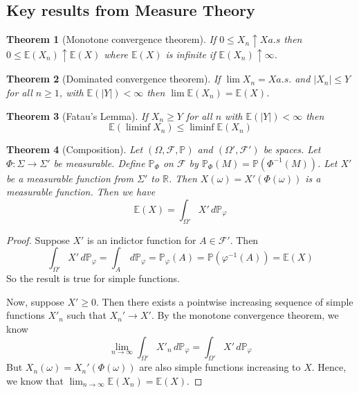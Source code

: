 \documentclass[10pt, oneside, reqno]{amsart}
\theoremstyle{plain}%
\newtheorem{thm}{Theorem}[section]
\theoremstyle{definition}
\theoremstyle{remark}
\renewcommand{\phi}{\varphi}
\newcommand{\sigf}{\mathcal{F}}
\newcommand{\R}{\mathbb{R}}
\newcommand{\E}{\mathbb{E}}
\renewcommand{\P}{\mathbb{P}}
\begin{document}
\subsection{Key results from Measure Theory} %
\label{sub:key_results_from_measure_theory}

\begin{thm}[Monotone convergence theorem]
	If $0 \leq X_n \uparrow X a.s$ then $0 \leq \E(X_n) \uparrow \E(X)$ where $\E(X)$ is infinite if $\E(X_n) \uparrow \infty$.
\end{thm}

\begin{thm}[Dominated convergence theorem]
	If $\lim X_n = X a.s.$ and $|X_n | \leq Y$ for all $n \geq 1$, with $\E(|Y|) < \infty$ then $\lim \E(X_n) = \E(X)$.
\end{thm}

\begin{thm}[Fatau's Lemma]
	If $X_n \geq Y$ for all $n$ with $\E(|Y|) < \infty$ then \[
		\E( \liminf X_n) \leq \liminf \E(X_n)
	\]
\end{thm}


\begin{thm}[Composition]
	Let $(\Omega, \sigf, \P)$ and $(\Omega', \sigf')$ be spaces.  Let $\Phi: \Sigma \rightarrow \Sigma'$ be measurable.  Define $\P_\Phi$ on $\sigf$ by $\P_\Phi(M) = \P(\Phi^{-1}(M))$.  Let $X'$ be a measurable function from $\Sigma'$ to $\R$.  Then $X(\omega) = X'(\Phi(\omega))$ is a measurable function.  Then we have 
	\[
		\E(X) = \int_{\Omega'} X' \, d\P_\phi
	\]
\end{thm}

\begin{proof}
	Suppose $X'$ is an indictor function for $A \in \sigf'$.  Then \[
		\int_{\Omega'} X' \, d\P_\phi = \int_A \, d\P_\phi = \P_\phi(A) = \P(\phi^{-1}(A)) = \E(X)
	\]
	So the result is true for simple functions.  
	
	Now, suppose $X' \geq 0$.  Then there exists a pointwise increasing sequence of simple functions $X'_n$ such that $X_n' \rightarrow X'$.  By the monotone convergence theorem, we know \[
		\lim_{n \rightarrow \infty} \int_{\Omega'} X'_n \, d\P_\phi = \int_{\Omega'} X' \, d\P_\phi
	\] 
	But $X_n(\omega) = X_n'(\Phi(\omega) )$ are also simple functions increasing to $X$.  Hence, we know that $\lim_{n \rightarrow \infty} \E(X_n) = \E(X)$.
\end{proof}
\end{document}

